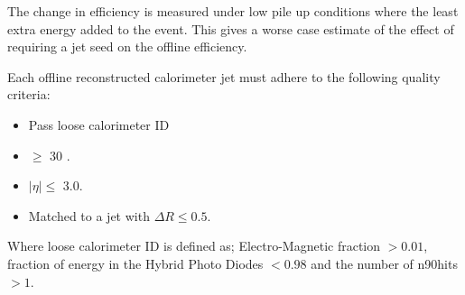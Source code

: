 The change in efficiency is measured under low pile up conditions where the 
least extra energy added to the event. This gives a worse case estimate of the 
effect of requiring a jet seed on the offline efficiency.

Each offline reconstructed calorimeter jet must adhere to the following quality 
criteria:
\begin{itemize}
\item Pass loose calorimeter ID 
\item \PT $\geq$ 30 \GeV.
\item $|\eta| \leq$ 3.0.
\item Matched to a \Lone jet with $\Delta R \leq 0.5$.
\end{itemize}
Where loose calorimeter ID is defined as; Electro-Magnetic fraction $> 0.01$, fraction of energy in the Hybrid Photo Diodes $< 
0.98$ and the number of n90hits $> 1$.

